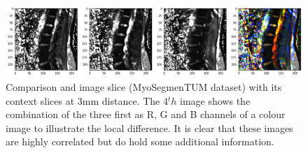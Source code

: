 \begin{figure}
    \includegraphics[width=.99\textwidth]{images/Context_slices.png}
    \caption{Comparison and image slice (MyoSegmenTUM dataset) with its context slices at 3mm distance. The 4$^th$ image shows the combination of the three first as R, G and B channels of a colour image to illustrate the local difference.
    It is clear that these images are highly correlated but do hold some additional information.}
\end{figure}

